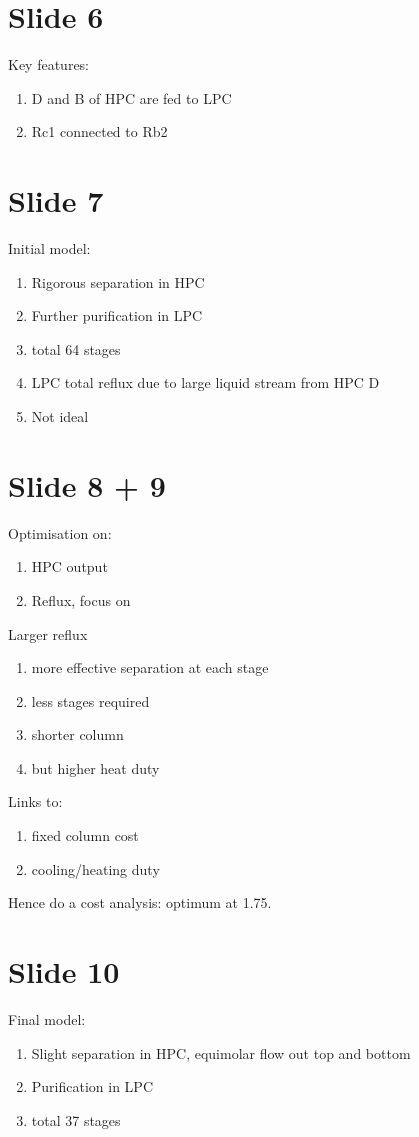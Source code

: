 \documentclass[11pt,oneside]{article}
\begin{document}
\section{Slide 6}
    Key features:
    \begin{enumerate}
        \item D and B of HPC are fed to LPC
        \item Rc1 connected to Rb2
    \end{enumerate}

\section{Slide 7}
    Initial model:
    \begin{enumerate}
        \item Rigorous separation in HPC
        \item Further purification in LPC
        \item total 64 stages
        \item LPC total reflux due to large liquid stream from HPC D
        \item Not ideal
    \end{enumerate}
    
\section{Slide 8 + 9}
    Optimisation on:
    \begin{enumerate}
        \item HPC output
        \item Reflux, focus on
    \end{enumerate}
    Larger reflux
    \begin{enumerate}
        \item more effective separation at each stage
        \item less stages required
        \item shorter column
        \item but higher heat duty
    \end{enumerate}
    Links to:
    \begin{enumerate}
        \item fixed column cost
        \item cooling/heating duty
    \end{enumerate}
    Hence do a cost analysis: optimum at 1.75.

\section{Slide 10}
    Final model:
    \begin{enumerate}
        \item Slight separation in HPC, equimolar flow out top and bottom
        \item Purification in LPC
        \item total 37 stages
    \end{enumerate}
    
\end{document}
